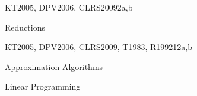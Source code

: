 \begin{syllabus}
\begin{unit}{\ALBasicAutomataComputabilityandComplexity}{}{KT2005, DPV2006, CLRS2009}{2}{a,b}
\begin{topics}%
    \item \ALBasicAutomataComputabilityandComplexityTopicIntroduction %
    \item \ALBasicAutomataComputabilityandComplexityTopicIntroductionTo %
    \item Reductions
\end{topics}
\begin{learningoutcomes}
    \item \ALBasicAutomataComputabilityandComplexityLODefine [\Familiarity] %
    \item \ALBasicAutomataComputabilityandComplexityLOExplainTheNp [\Familiarity] %
\end{learningoutcomes}
\end{unit}

\begin{unit}{\ALAdvancedDataStructuresAlgorithmsandAnalysis}{}{KT2005, DPV2006, CLRS2009, T1983, R1992}{12}{a,b}
\begin{topics}%
    \item \ALAdvancedDataStructuresAlgorithmsandAnalysisTopicGraphs %
    \item \ALAdvancedDataStructuresAlgorithmsandAnalysisTopicRandomized %
    \item \ALAdvancedDataStructuresAlgorithmsandAnalysisTopicAmortized %
    \item \ALAdvancedDataStructuresAlgorithmsandAnalysisTopicProbabilistic %
    \item Approximation Algorithms 
    \item Linear Programming
\end{topics}
\begin{learningoutcomes}
    \item \ALAdvancedDataStructuresAlgorithmsandAnalysisLOUnderstand [\Familiarity]%
    \item \ALAdvancedDataStructuresAlgorithmsandAnalysisLOSelectAnd [\Usage] %
\end{learningoutcomes}
\end{unit}

\begin{coursebibliography}
\end{coursebibliography}

\end{syllabus}
